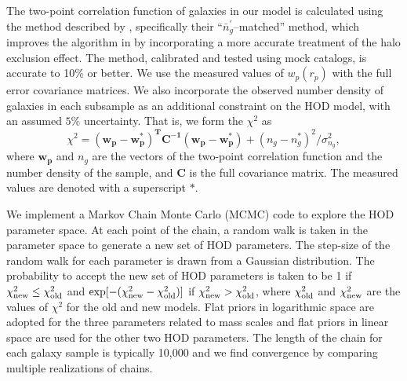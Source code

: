 \documentclass[]{emulateapj}
\newcommand{\wrp}{{w_p(r_p)}}
\begin{document}
The two-point correlation function of galaxies in our model is calculated 
using the method described by \citet{tinker05}, specifically their 
``$\bar{n}_g^\prime$--matched'' method, 
which improves the algorithm in \citet{zheng04} by incorporating a more 
accurate treatment of the halo exclusion effect. The method, calibrated and 
tested using mock catalogs, is accurate to 10\% or better.
We use the measured values of $\wrp$ with the full error covariance matrices. 
We also incorporate the observed number density of galaxies in each subsample
as an additional constraint on the HOD model, with an assumed $5\%$
uncertainty. That is, we form the $\chi^2$ as  
\begin{equation}
\chi^2= \mathbf{(w_p-w_p^*)^T C^{-1} (w_p-w_p^*)}
       +(n_g-n_g^*)^2/\sigma_{n_g}^2,
\end{equation}
where $\mathbf{w_p}$ and $n_g$ are the vectors of the two-point 
correlation function and the number density of the sample, and $\mathbf{C}$
is the full covariance matrix. The measured values are denoted with a 
superscript $*$. 

We implement a Markov Chain Monte Carlo (MCMC) code 
to explore the HOD parameter space. 
At each point of the chain, a random walk is taken in the parameter space 
to generate a new set of HOD parameters. The step-size of the random walk for 
each parameter is drawn from a Gaussian distribution. 
The probability to accept the new set
of HOD parameters is taken to be 1 if $\chi^2_{\rm new}\leq\chi^2_{\rm old}$
and $\exp[-(\chi^2_{\rm new}- \chi^2_{\rm old})]$ if
$\chi^2_{\rm new}>\chi^2_{\rm old}$, where $\chi^2_{\rm old}$ and
$\chi^2_{\rm new}$ are the values of $\chi^2$ for the old and new models.
Flat priors in logarithmic space are adopted for the three parameters related to
mass scales and flat priors in linear space are used for the other two HOD 
parameters. The length of the chain for each galaxy sample is typically 
10,000 and we find convergence by comparing multiple realizations of chains.
\end{document}
